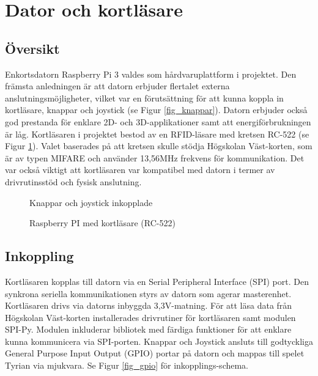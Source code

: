 \documentclass[12pt,fleqn,openany]{book} %
\begin{document}
\section{Dator och kortläsare}
\subsection{Översikt}
Enkortsdatorn Raspberry Pi 3 valdes som hårdvaruplattform i projektet. Den främsta anledningen är att datorn erbjuder flertalet
externa anslutningsmöjligheter, vilket var en förutsättning för att kunna koppla in kortläsare, knappar och joystick (se Figur \ref{fig_knappar}). Datorn 
erbjuder också god prestanda för enklare 2D- och 3D-applikationer samt att energiförbrukningen är låg. Kortläsaren i projektet 
bestod av en RFID-läsare med kretsen RC-522 (se Figur \ref{fig_pirfid}). Valet baserades på att kretsen skulle stödja Högskolan Väst-korten, som är av typen 
MIFARE och använder 13,56MHz frekvens för kommunikation. Det var också viktigt att kortläsaren var kompatibel med datorn i termer 
av drivrutinsstöd och fysisk anslutning.

\begin{figure}[!htb]
  \begin{minipage}{0.44\textwidth}
    \centering
    \caption{Knappar och joystick inkopplade}
    \label{fig_knappar}
  \end{minipage}\hfill
  \begin{minipage}{0.44\textwidth}
    \centering
    \caption{Raspberry PI med kortläsare (RC-522)}
    \label{fig_pirfid}
  \end{minipage}\hfill 
\end{figure}

\subsection{Inkoppling}
Kortläsaren kopplas till datorn via en Serial Peripheral Interface (SPI) port. Den synkrona seriella kommunikationen styrs av 
datorn som agerar masterenhet. Kortläsaren drivs via datorns inbyggda 3,3V-matning. För att läsa data från Högskolan Väst-korten 
installerades drivrutiner för kortläsaren samt modulen SPI-Py. Modulen inkluderar bibliotek med färdiga funktioner för att enklare 
kunna kommunicera via SPI-porten. Knappar och Joystick ansluts till godtyckliga General Purpose Input Output (GPIO) portar på datorn 
och mappas till spelet Tyrian via mjukvara. Se Figur \ref{fig_gpio} för inkopplings-schema.
\end{document}
